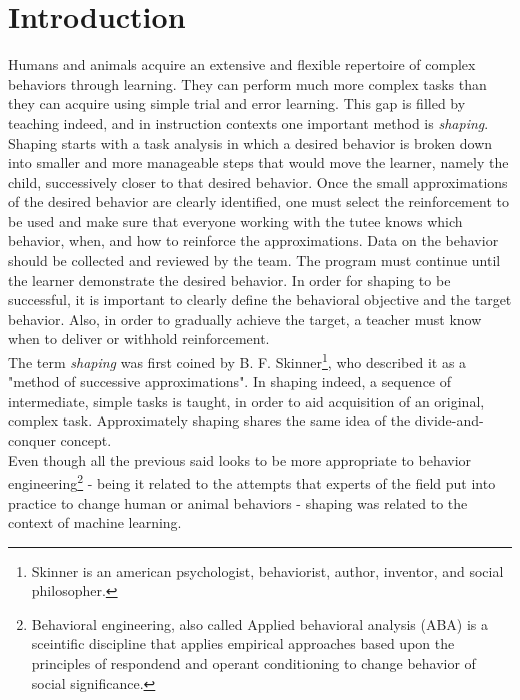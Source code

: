 \chapter{Introduction}
Humans and animals acquire an extensive and flexible repertoire of complex behaviors through learning. They can perform
much more complex tasks than they can acquire using simple trial and error learning. 
This gap is filled by teaching indeed, and in instruction contexts one important method is \textit{shaping}. Shaping starts with a task analysis in which a desired
behavior is broken down into smaller and more manageable steps that would move the learner, namely the child, successively closer to that desired behavior. Once the small approximations of the desired behavior are clearly
identified, one must select the reinforcement to be used and make sure that everyone working with the tutee knows which behavior, when, and how to reinforce the approximations.
Data on the behavior should be collected and reviewed by the team. The program must continue until the learner demonstrate the desired behavior.
In order for shaping to be successful, it is important to clearly define the behavioral objective and the target behavior. Also, in order to gradually achieve the target, 
a teacher must know when to deliver or withhold reinforcement. \\
The term \textit{shaping} was first coined 
by B. F. Skinner\footnote{Skinner is an american psychologist, behaviorist, author, inventor, and social philosopher.}, 
who described it as a "method of successive approximations". In shaping indeed, a sequence of intermediate, simple tasks is taught, in order to aid acquisition of an original,
complex task. Approximately shaping shares the same idea of the divide-and-conquer concept.\\
Even though all the previous said looks to be more appropriate
to behavior engineering\footnote{Behavioral engineering, also called Applied behavioral analysis (ABA) is a sceintific discipline that applies
empirical approaches based upon the principles of respondend and operant conditioning to change behavior of social significance.}
- being it related to the attempts that experts of the field put into practice to change human or animal behaviors - 
shaping was related to the context of machine learning.\\

